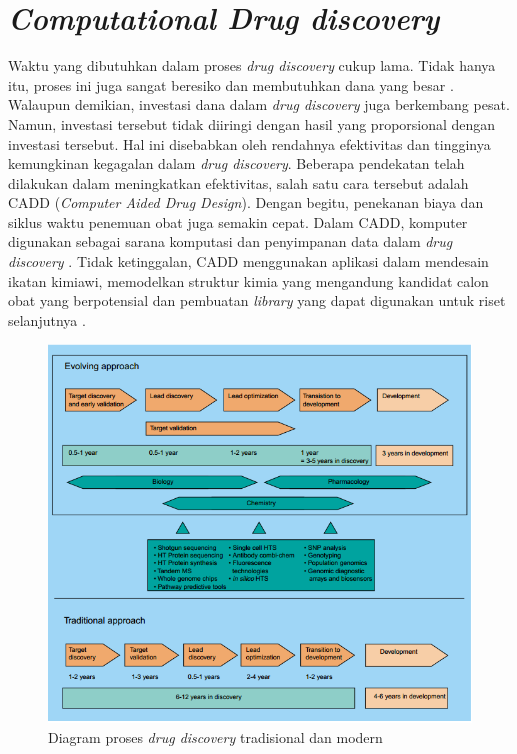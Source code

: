 \section{\textit{Computational Drug discovery}}
\hspace{0.5cm}Waktu yang dibutuhkan dalam proses \textit{drug discovery} cukup lama. Tidak hanya itu, proses ini juga sangat beresiko dan membutuhkan dana yang besar \cite{Drugdiscovery2}. Walaupun demikian, investasi dana dalam \textit{drug discovery} juga berkembang pesat. Namun, investasi tersebut tidak diiringi dengan hasil yang proporsional dengan investasi tersebut. Hal ini disebabkan oleh rendahnya efektivitas dan tingginya kemungkinan kegagalan dalam \textit{drug discovery}. Beberapa pendekatan telah dilakukan dalam meningkatkan efektivitas, salah satu cara tersebut adalah CADD (\textit{Computer Aided Drug Design}). Dengan begitu, penekanan biaya dan siklus waktu penemuan obat juga semakin cepat. Dalam CADD, komputer digunakan sebagai sarana komputasi dan penyimpanan data dalam \textit{drug discovery} \cite{doCADD}. Tidak ketinggalan, CADD menggunakan aplikasi dalam mendesain ikatan kimiawi, memodelkan struktur kimia yang mengandung kandidat calon obat yang berpotensial dan pembuatan \textit{library} yang dapat digunakan untuk riset selanjutnya \cite{reviewCADD}.
\begin{figure}
	\centering
	\includegraphics[scale=0.6]{siklus_dd.png}
	\caption{Diagram proses \textit{drug discovery} tradisional dan modern \cite{diagram drug discovery}}
\end{figure}
